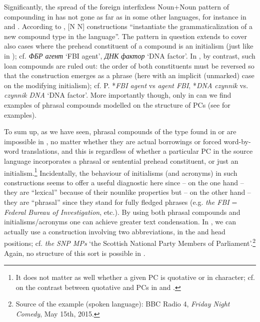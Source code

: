 \documentclass[output=paper]{LSP/langsci}
\begin{document}
{Significantly, the spread of the foreign interfixless Noun+Noun pattern of compounding in  has not gone as far as in some other  languages, for instance in  and . According to \citet{Bagasheva2015},  [N N] constructions “instantiate the grammaticalization of a new compound type in the language”. The  pattern in question extends to cover also cases where the prehead constituent of a compound is an initialism (just like in ); cf.} {\textit{{ФБР агент}}} {‘FBI agent’,} {\textit{{ДНК}}} {\textit{{фактор}}} {‘DNA factor’. In , by contrast, such loan compounds are ruled out: the order of both constituents must be reversed so that the construction emerges as a phrase (here with an implicit (unmarked)  case on the modifying initialism); cf. P. *}{\textit{FBI agent}} {vs} {\textit{agent FBI}}{, *}{\textit{DNA czynnik}} {vs.} {\textit{czynnik DNA}} {‘DNA factor’. More importantly though, only in  can we find examples of phrasal compounds modelled on the structure of  PCs (see  for examples).}

{To sum up, as we have seen, phrasal compounds of the type found in  or  are impossible in , no matter whether they are actual borrowings or forced word-by-word translations, and this is regardless of whether a particular PC in the source language incorporates a} {phrasal or sentential prehead constituent, or just an initialism.}\footnote{{It does not matter as well whether a given PC is quotative or  in character; cf. \citet{Pafel2015} on the contrast between quotative and  PCs in  and .}} {Incidentally, the behaviour of initialisms (and acronyms) in such constructions seems to offer a useful diagnostic here since – on the one hand – they are “lexical” because of their nounlike properties but – on the other hand – they are “phrasal” since they stand for fully fledged phrases (e.g.} {\textit{the FBI}} {=} {\textit{Federal Bureau of Investigation}}{, etc.). By using both phrasal compounds and initialisms/acronyms one can achieve greater text condensation. In , we can actually use a construction involving two abbreviations, in the  and head positions; cf.} {\textit{the SNP MPs}} {‘the Scottish National Party Members of Parliament’.}\footnote{{Source of the example (spoken language): BBC Radio 4,} {\textit{Friday Night Comedy}}{, May 15th, 2015.}} {Again, no structure of this sort is possible in .}
\end{document}
